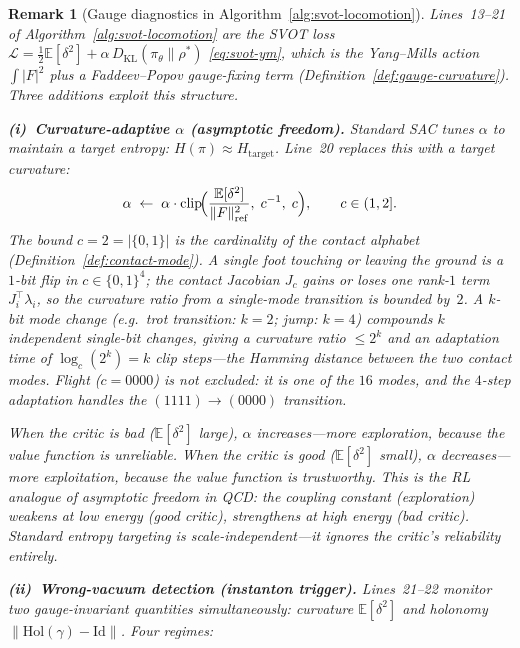 \documentclass[11pt,a4paper]{article}
\newtheorem{remark}[theorem]{Remark}
\newcommand{\cL}{\mathcal{L}}
\newcommand{\norm}[1]{\lVert #1 \rVert}
\newcommand{\DKL}{D_{\mathrm{KL}}}
\begin{document}
\begin{remark}[Gauge diagnostics in
  Algorithm~\ref{alg:svot-locomotion}]%
\label{rem:gauge-alg}
\color{black!60}%
Lines~13--21 of Algorithm~\ref{alg:svot-locomotion}
are the SVOT loss
$\cL = \tfrac{1}{2}\mathbb{E}[\delta^2]
  + \alpha\,\DKL(\pi_\theta \| \rho^*)$
\eqref{eq:svot-ym},
which is the Yang--Mills action
$\int|F|^2$
plus a Faddeev--Popov gauge-fixing term
(Definition~\ref{def:gauge-curvature}).
Three additions exploit this structure.

\medskip\noindent
\textbf{(i)\ Curvature-adaptive $\alpha$
  (asymptotic freedom).}\;
Standard SAC tunes $\alpha$ to maintain a target
\emph{entropy}: $H(\pi) \approx H_{\mathrm{target}}$.
Line~20 replaces this with a target
\emph{curvature}:
\[
  \alpha
  \;\gets\;
  \alpha
  \cdot
  \mathrm{clip}\!\Bigl(
    \frac{\mathbb{E}[\delta^2]}
         {\norm{F}^2_{\mathrm{ref}}},\;
    c^{-1},\; c
  \Bigr),
  \qquad c \in (1, 2].
\]
The bound $c = 2 = |\{0,1\}|$ is the cardinality of the
contact alphabet
(Definition~\ref{def:contact-mode}).
A single foot touching or leaving the ground is a
$1$-bit flip in $c \in \{0,1\}^4$;
the contact Jacobian $J_c$ gains or loses one
rank-$1$ term $J_i^\top \lambda_i$,
so the curvature ratio from a single-mode transition
is bounded by~$2$.
A $k$-bit mode change (e.g.\ trot transition: $k = 2$;
jump: $k = 4$) compounds $k$ independent
single-bit changes,
giving a curvature ratio $\leq 2^k$
and an adaptation time of
$\log_c(2^k) = k$ clip steps---the
Hamming distance between the two contact modes.
Flight ($c = 0000$) is not excluded:
it is one of the $16$ modes,
and the $4$-step adaptation handles the
$(1111) \to (0000)$ transition.

When the critic is bad ($\mathbb{E}[\delta^2]$ large),
$\alpha$ increases---more exploration,
because the value function is unreliable.
When the critic is good ($\mathbb{E}[\delta^2]$ small),
$\alpha$ decreases---more exploitation,
because the value function is trustworthy.
This is the RL analogue of \emph{asymptotic freedom}
in QCD:
the coupling constant (exploration) weakens
at low energy (good critic),
strengthens at high energy (bad critic).
Standard entropy targeting is
scale-independent---it ignores the critic's
reliability entirely.

\medskip\noindent
\textbf{(ii)\ Wrong-vacuum detection
  (instanton trigger).}\;
Lines~21--22 monitor two gauge-invariant
quantities simultaneously:
curvature $\mathbb{E}[\delta^2]$
and holonomy
$\norm{\mathrm{Hol}(\gamma) - \mathrm{Id}}$.
Four regimes:


\end{remark}
\end{document}
